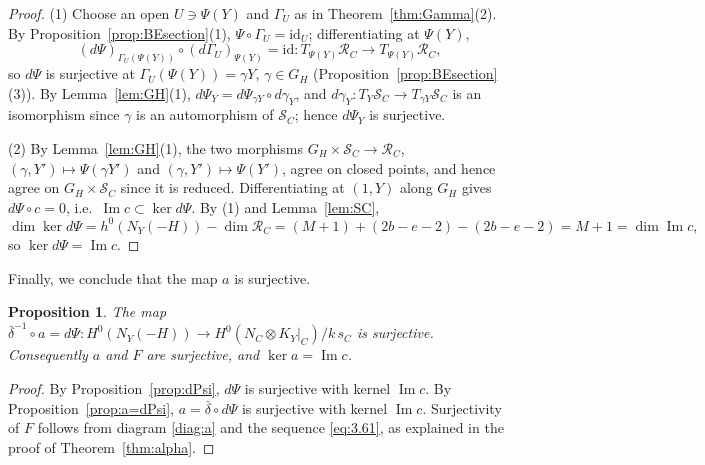 \documentclass[11pt,reqno]{amsart}
\theoremstyle{plain}
\newtheorem{proposition}[theorem]{Proposition}
\theoremstyle{definition}
\newcommand{\PP}{\mathbb{P}}
\newcommand{\OO}{\mathcal{O}}
\newcommand{\coker}{\operatorname{coker}}
\renewcommand{\Im}{\operatorname{Im}}
\newcommand{\id}{\mathrm{id}}
\newcommand{\Yt}{\widetilde{Y}}
\newcommand{\NY}{N_{Y}}
\newcommand{\SC}{\mathcal{S}_C}
\newcommand{\RC}{\mathcal{R}_C}
\newcommand{\GH}{G_H}
\begin{document}
\begin{proof}
(1) Choose an open $U\ni\Psi(Y)$ and $\Gamma_U$ as in Theorem~\ref{thm:Gamma}(2). By Proposition~\ref{prop:BEsection}(1), $\Psi\circ\Gamma_U=\id_U$; differentiating at $\Psi(Y)$,
\[
(d\Psi)_{\Gamma_U(\Psi(Y))}\circ {(d\Gamma_U)}_{\Psi(Y)}=\id\colon T_{\Psi(Y)}\RC\to T_{\Psi(Y)}\RC,
\]
so $d\Psi$ is surjective at $\Gamma_U(\Psi(Y))=\gamma Y$, $\gamma\in\GH$ (Proposition~\ref{prop:BEsection}(3)). By Lemma~\ref{lem:GH}(1), $d\Psi_Y=d\Psi_{\gamma Y}\circ d\gamma_Y$, and $d\gamma_Y\colon T_Y\SC\to T_{\gamma Y}\SC$ is an isomorphism since $\gamma$ is an automorphism of $\SC$; hence $d\Psi_Y$ is surjective.

(2) By Lemma~\ref{lem:GH}(1), the two morphisms $\GH\times\SC\to\RC$, $(\gamma,Y')\mapsto\Psi(\gamma Y')$ and $(\gamma,Y')\mapsto\Psi(Y')$, agree on closed points, and hence agree on $\GH\times\SC$ since it is reduced. Differentiating at $(1,Y)$ along $\GH$ gives $d\Psi\circ c=0$, i.e.\ $\Im c\subset\ker d\Psi$. By (1) and Lemma~\ref{lem:SC},
\[
\dim\ker d\Psi=h^0(\NY(-H))-\dim\RC=(M+1)+(2b-e-2)-(2b-e-2)=M+1=\dim\Im c ,
\]
so $\ker d\Psi=\Im c$.
\end{proof}

Finally, we conclude that the map $a$ is surjective.

\begin{proposition}\label{prop:a-surj}
The map $\bar\delta^{-1}\circ a=d\Psi\colon H^0(\NY(-H))\to H^0(N_C\otimes K_Y|_C)/k\,s_C$ is surjective. Consequently $a$ and $F$ are surjective, and $\ker a=\Im c$.
\end{proposition}

\begin{proof}
By Proposition~\ref{prop:dPsi}, $d\Psi$ is surjective with kernel $\Im c$. By Proposition~\ref{prop:a=dPsi}, $a=\bar\delta\circ d\Psi$ is surjective with kernel $\Im c$. Surjectivity of $F$ follows from diagram \eqref{diag:a} and the sequence \eqref{eq:3.61}, as explained in the proof of Theorem~\ref{thm:alpha}.
\end{proof}

\end{document}
